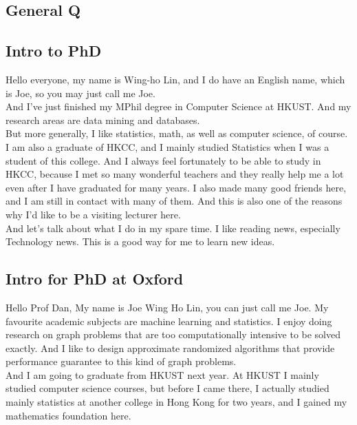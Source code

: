 \documentclass[12pt, landscape]{article}
\begin{document}
\begin{multicols}{2}

\section{General Q}

\subsection{Intro to PhD}
Hello everyone, my name is Wing-ho Lin, and I do have an English name, which is Joe, so you may just call me Joe.\\

And I've just finished my MPhil degree in Computer Science at HKUST. And my research areas are data mining and databases. \\

But more generally, I like statistics, math, as well as computer science, of course.\\

I am also a graduate of HKCC, and I mainly studied Statistics when I was a student of this college. And I always feel fortunately to be able to study in HKCC, because I met so many wonderful teachers and they really help me a lot even after I have graduated for many years. I also made many good friends here, and I am still in contact with many of them. And this is also one of the reasons why I'd like to be a visiting lecturer here. \\

And let's talk about what I do in my spare time. I like reading news, especially Technology news. This is a good way for me to learn new ideas. \\



\subsection{Intro for PhD at Oxford}

Hello Prof Dan, My name is Joe Wing Ho Lin, you can just call me Joe. My favourite academic subjects are machine learning and statistics. I enjoy doing research on graph problems that are too computationally intensive to be solved exactly. And I like to design approximate randomized algorithms  that provide performance guarantee to this kind of graph problems.\\

And I am going to graduate from HKUST next year. At HKUST I mainly studied computer science courses, but before I came there, I actually studied mainly statistics at another college in Hong Kong for two years, and I gained my mathematics foundation here.\\


\end{multicols}
\end{document}
